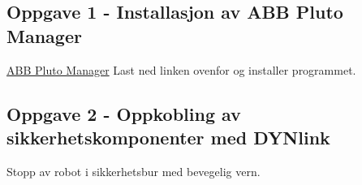 

\newpage

\subsection*{Oppgave 1 - Installasjon av ABB Pluto Manager }
\href{https://rfka-my.sharepoint.com/:u:/g/personal/fred-olav_mosdal_skole_rogfk_no/EXYSaIMGo-BFvDd488mXYn0B0UXdTA8qD8cghVLqVX8BFg?e=bde0vi}{ABB Pluto Manager}
Last ned linken ovenfor og installer programmet. 

\subsection*{Oppgave 2 -  Oppkobling av sikkerhetskomponenter med DYNlink }

Stopp av robot i sikkerhetsbur med bevegelig vern. 


